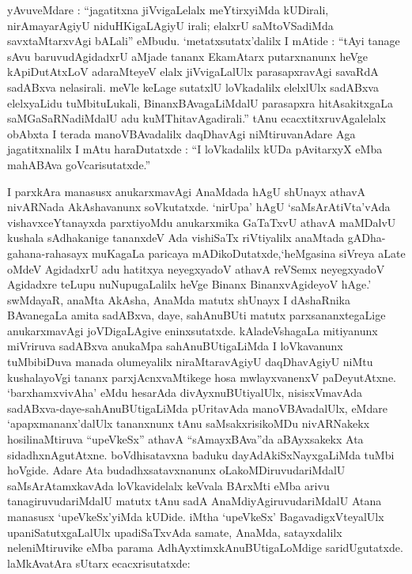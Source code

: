 yAvuveMdare : ``jagatitxna jiVvigaLelalx meYtirxyiMda kUDirali, nirAmayarAgiyU niduHKigaLAgiyU irali; elalxrU saMtoVSadiMda savxtaMtarxvAgi bALali'' eMbudu. `metatxsutatx'dalilx I mAtide : ``tAyi tanage sAvu baruvudAgidadxrU aMjade tananx EkamAtarx putarxnanunx heVge kApiDutAtxLoV adaraMteyeV elalx jiVvigaLalUlx parasapxravAgi savaRdA sadABxva nelasirali. meVle keLage sutatxlU loVkadalilx elelxlUlx sadABxva elelxyaLidu tuMbituLukali, BinanxBAvagaLiMdalU parasapxra hitAsakitxgaLa saMGaSaRNadiMdalU adu kuMThitavAgadirali.'' tAnu ecacxtitxruvAgalelalx obAbxta I terada manoVBAvadalilx daqDhavAgi niMtiruvanAdare Aga jagatitxnalilx I mAtu haraDutatxde : ``I loVkadalilx kUDa pAvitarxyX eMba mahABAva goVcarisutatxde.''

I parxkAra manasusx anukarxmavAgi AnaMdada hAgU shUnayx athavA nivARNada AkAshavanunx soVkutatxde. `nirUpa' hAgU `saMsArAtiVta'vAda vishavxceYtanayxda parxti\break\-yoMdu anukarxmika GaTaTxvU athavA maMDalvU kushala sAdhakanige tananxdeV Ada vishiSaTx riVtiyalilx anaMtada gADha-gahana-rahasayx muKagaLa paricaya mADikoDu\-tatxde,\break `heMgasina siVreya aLate oMdeV AgidadxrU adu hatitxya neyegxyadoV athavA reVSemx neyegxyadoV Agidadxre teLupu nuNupugaLalilx heVge Binanx BinanxvAgideyoV hAge.' swMdayaR, anaMta AkAsha, AnaMda matutx shUnayx I dAshaRnika BAvanegaLa amita sadABxva, daye, sahAnuBUti matutx parxsananxtegaLige anukarxmavAgi joVDigaLAgive eninx\-sutatxde. kAladeVshagaLa mitiyanunx miVriruva sadABxva anukaMpa sahAnuBUti\-gaLiMda I loVkavanunx tuMbibiDuva manada olumeyalilx niraMtaravAgiyU daqDhavAgiyU niMtu kushalayoVgi tananx parxjAcnxvaMtikege hosa mwlayxvanenxV paDeyutAtxne. `barxhamx\-vivAha' eMdu hesarAda divAyxnuBUtiyalUlx, nisisxVmavAda sadABxva-daye-sahAnuBUti\-gaLiMda pUritavAda manoVBAvadalUlx, eMdare `apapxmananx'dalUlx tananxnunx tAnu saMsakx\-risikoMDu nivARNakekx hosilinaMtiruva ``upeVkeSx'' athavA ``sAmayxBAva''da aBAyxsakekx Ata sidadhxnAgutAtxne. boVdhisatavxna baduku dayAdAkiSxNayxgaLiMda tuMbi hoVgide. Adare Ata budadhxsatavxnanunx oLakoMDiruvudariMdalU saMsArAtamxkavAda loVkavidelalx \hbox{keVvala} BArxMti eMba arivu tanagiruvudariMdalU matutx tAnu sadA AnaMdiyAgiruvuda\-riMdalU Atana manasusx `upeVkeSx'yiMda kUDide. iMtha `upeVkeSx' BagavadigxVteyalUlx upaniSatutxgaLalUlx upadiSaTxvAda samate, AnaMda, satayxdalilx neleniMtiruvike eMba parama AdhAyxtimxkAnuBUtigaLoMdige saridUgutatxde. laMkAvatAra sUtarx ecacxrisu\-tatxde:
